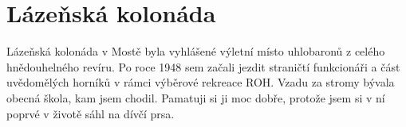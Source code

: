 
\chapter{Lázeňská kolonáda}


Lázeňská kolonáda v Mostě byla vyhlášené výletní místo uhlobaronů z celého
hnědouhelného revíru. Po roce 1948 sem začali jezdit straničtí funkcionáři a
část uvědomělých horníků v rámci výběrové rekreace ROH. Vzadu za stromy bývala
obecná škola, kam jsem chodil. Pamatuji si ji moc dobře, protože jsem si v ní
poprvé v životě sáhl na dívčí prsa.
